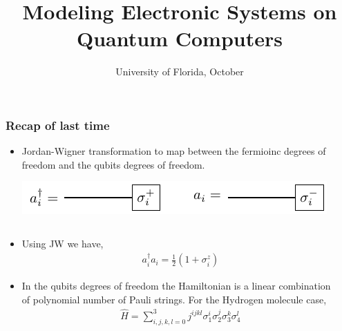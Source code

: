 \documentclass{beamer}
\title{Modeling Electronic Systems on Quantum Computers}
\date{University of Florida, October}
\renewcommand{\(}{\left(}
\renewcommand{\)}{\right)}
\renewcommand{\[}{\left[}
\renewcommand{\]}{\right]}
\begin{document}
\frame{\titlepage} 

\begin{frame}
    \frametitle{Recap of last time}
    \begin{itemize}
        \item Jordan-Wigner transformation to map between the fermioinc degrees of freedom and the qubits degrees of freedom. 
        \begin{center}
            \includegraphics[]{jordan_wigner.pdf}
        \end{center} 
    \end{itemize}
    \begin{columns}
        \begin{column}[]{0.6\textwidth}
            \begin{itemize}
                \item Using JW we have, 
                \begin{align*}
                    a^\dagger_i a_i = \frac{1}{2} (1+\sigma^z_i)
                \end{align*}
                \item In the qubits degrees of freedom the Hamiltonian is a linear combination of polynomial number of Pauli strings. For the Hydrogen molecule case, 
                \begin{align*}
                    \hat{H} = \sum_{i,j,k,l = 0}^ 3 j^{ijkl} \sigma^i_1 \sigma^j_2 \sigma^k_3 \sigma^l_4 
                \end{align*}
            \end{itemize}
        \end{column}
        \begin{column}[]{0.35\textwidth}
            \begin{center}

\end{center}
\end{column}
\end{columns}
\end{frame}
\end{document}
